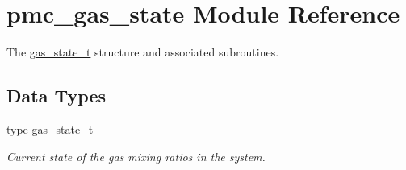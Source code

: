 \hypertarget{namespacepmc__gas__state}{}\section{pmc\+\_\+gas\+\_\+state Module Reference}
\label{namespacepmc__gas__state}


The \mbox{\hyperlink{structpmc__gas__state_1_1gas__state__t}{gas\+\_\+state\+\_\+t}} structure and associated subroutines.  


\subsection*{Data Types}
\begin{DoxyCompactItemize}
\item 
type \mbox{\hyperlink{structpmc__gas__state_1_1gas__state__t}{gas\+\_\+state\+\_\+t}}
\begin{DoxyCompactList}\small\item\em Current state of the gas mixing ratios in the system. \end{DoxyCompactList}\end{DoxyCompactItemize}
